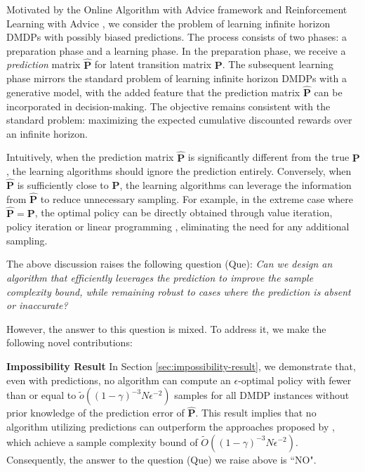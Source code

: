 \documentclass[12pt]{article}
\begin{document}
Motivated by the Online Algorithm with Advice framework \cite{mitzenmacher2022algorithms} and Reinforcement Learning with Advice \cite{golowich2022can}, 
we consider the problem of learning infinite horizon DMDPs with possibly biased predictions. The process consists of two phases: a preparation phase and a learning phase. In the preparation phase, we receive a \textit{prediction} matrix $\hat{\boldsymbol{\text{P}}}$ for latent transition matrix $\boldsymbol{\text{P}}$. The subsequent learning phase mirrors the standard problem of learning infinite horizon DMDPs with a generative model, with the added feature that the prediction matrix $\hat{\boldsymbol{\text{P}}}$ can be incorporated in decision-making. The objective remains consistent with the standard problem: maximizing the expected cumulative discounted rewards over an infinite horizon.

Intuitively, when the prediction matrix $\hat{\boldsymbol{\text{P}}}$ is significantly different from the true $\boldsymbol{\text{P}}$, the learning algorithms should ignore the prediction entirely. Conversely, when $\hat{\boldsymbol{\text{P}}}$ is sufficiently close to $\boldsymbol{\text{P}}$, the learning algorithms can leverage the information from $\hat{\boldsymbol{\text{P}}}$ to reduce unnecessary sampling. For example, in the extreme case where $\hat{\boldsymbol{\text{P}}} = \boldsymbol{\text{P}}$, the optimal policy can be directly obtained through value iteration, policy iteration or linear programming \cite{puterman2014markov}, eliminating the need for any additional sampling.

The above discussion raises the following question (Que): 
\textit{Can we design an algorithm that efficiently leverages the prediction to improve the sample complexity bound, while remaining robust to cases where the prediction is absent or inaccurate?}

However, the answer to this question is mixed. To address it, we make the following novel contributions:

\textbf{Impossibility Result} In Section \ref{sec:impossibility-result}, we demonstrate that, even with predictions, no algorithm can compute an $\epsilon$-optimal policy with fewer than or equal to $\tilde{o}((1-\gamma)^{-3} N \epsilon^{-2})$ samples for all DMDP instances without prior knowledge of the prediction error of $\hat{\boldsymbol{\text{P}}}$. This result implies that no algorithm utilizing predictions can outperform the approaches proposed by \cite{sidford2018near,wainwright2019variance,agarwal2020model}, which achieve a sample complexity bound of $\tilde{O}((1-\gamma)^{-3} N \epsilon^{-2})$. Consequently, the answer to the question (Que) we raise above is ``NO".
\end{document}
